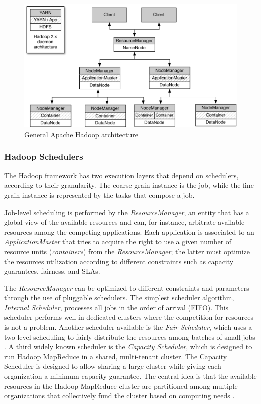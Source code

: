 \begin{figure}[!ht]
	\centering
	\includegraphics[width=1\linewidth]{img/HadoopArch.pdf}
	\caption{General Apache Hadoop architecture}
	\label{fig:ArquiteturaHadoop}
\end{figure}


\subsubsection{Hadoop Schedulers}

The Hadoop framework has two execution layers that depend on schedulers, according to their granularity. The coarse-grain instance is the job, while the fine-grain instance is represented by the tasks that compose a job. 

Job-level scheduling is performed by the \textit{ResourceManager}, an entity that has a global view of the available resources and can, for instance, arbitrate available resources among the competing applications. Each application is associated to an \textit{ApplicationMaster} that tries to acquire the right to use a given number of resource units (\textit{containers}) from the \textit{ResourceManager};  the latter must optimize the resources utilization according to different constraints such as capacity guarantees, fairness, and SLAs. 

 The \textit{ResourceManager} can be optimized to different constraints and parameters through the use of pluggable schedulers. The simplest scheduler algorithm, \textit{Internal Scheduler}, processes all jobs in the order of arrival (FIFO). This scheduler performs well in dedicated clusters where the competition for resources is not a problem. Another scheduler available is the \textit{Fair Scheduler}, which uses a two level scheduling to fairly distribute the resources among batches of small jobs \cite{Hadoop}. A third widely known scheduler is the \textit{Capacity Scheduler}, which is designed to run Hadoop MapReduce in a shared, multi-tenant cluster. The Capacity Scheduler is designed to allow sharing a large cluster while giving each organization a minimum capacity guarantee. The central idea is that the available resources in the Hadoop MapReduce cluster are partitioned among multiple organizations that collectively fund the cluster based on computing needs \cite{Hadoop}.

